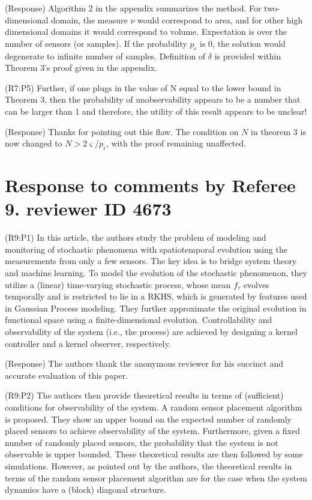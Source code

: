 \documentclass{letter}
\begin{document}
{\color{red}(Response)}  Algorithm 2 in the appendix summarizes the method. For two-dimensional domain, the measure $ \nu $ would correspond to area, and for other high dimensional domains it would correspond to volume. Expectation is over the number of sensors (or samples). If the probability $ p_\epsilon $ is 0, the solution would degenerate to infinite number of samples. Definition of $ \delta $ is provided  within Theorem 3's proof given in the appendix.  

{\color{red}(R7:P5)} Further, if one plugs in the value of N equal to the lower bound in Theorem 3, then the probability of unobservability appears to be a number that can be larger than 1 and therefore, the utility of this result appears to be unclear!

{\color{red}(Response)} Thanks for pointing out this flaw. The condition on $ N $ in theorem 3 is now changed to $ N > 2\varsigma/p_\epsilon $, with the proof remaining unaffected. 

\section{Response to comments by Referee 9. reviewer ID 4673}

{\color{red}(R9:P1)} In this article, the authors study the problem of modeling and monitoring of stochastic phenomena with spatiotemporal evolution using the measurements from only a few sensors. The key idea is to bridge system theory and machine learning. To model the evolution of the stochastic phenomenon, they utilize a (linear) time-varying stochastic process, whose mean $f_{\tau}$ evolves temporally and is restricted to lie in a RKHS, which is generated by features used in Gaussian Process modeling. They further approximate the original evolution in functional space using a finite-dimensional evolution.  Controllability and observability of the system (i.e., the process) are achieved by designing a kernel controller and a kernel observer, respectively.

{\color{red}(Response)} The authors thank the anonymous reviewer for his succinct and accurate evaluation of this paper.

{\color{red}(R9:P2)} The authors then provide theoretical results in terms of (sufficient) conditions for observability of the system. A random sensor placement algorithm is proposed. They show an upper bound on the expected number of randomly placed sensors to achieve observability of the system. Furthermore, given a fixed number of randomly placed sensors, the probability that the system is not observable is upper bounded. These theoretical results are then followed by some simulations. However, as pointed out by the authors, the theoretical results in terms of the random sensor placement algorithm are for the case when the system dynamics have a (block) diagonal structure.
\end{document}
